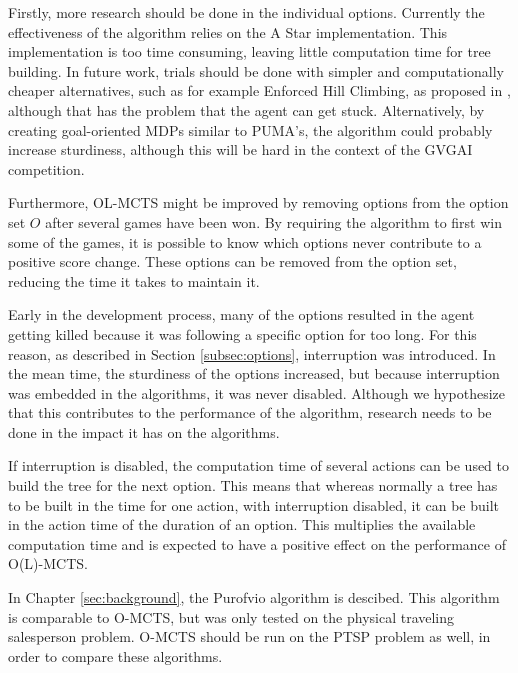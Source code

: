 Firstly, more research should be done in the individual options. Currently the
effectiveness of the algorithm relies on the A Star implementation.  This
implementation is too time consuming, leaving little computation time for tree
building. In future work, trials should be done with simpler and computationally
cheaper alternatives, such as for example Enforced Hill Climbing, as proposed in
\cite{ross2014general}, although that has the problem that the agent can get
stuck. Alternatively, by creating goal-oriented MDPs similar to PUMA's, the
algorithm could probably increase sturdiness, although this will be hard in the
context of the GVGAI competition.

Furthermore, OL-MCTS might be improved by removing options from the option set
$O$ after several games have been won. By requiring the algorithm to first win
some of the games, it is possible to know which options never contribute to a
positive score change. These options can be removed from the option set,
reducing the time it takes to maintain it.

Early in the development process, many of the options resulted in the agent
getting killed because it was following a specific option for too long. For this
reason, as described in Section \ref{subsec:options}, interruption was
introduced. In the mean time, the sturdiness of the options increased, but
because interruption was embedded in the algorithms, it was never disabled.
Although we hypothesize that this contributes to the performance of the
algorithm, research needs to be done in the impact it has on the algorithms.

If interruption is disabled, the computation time of several actions can be
used to build the tree for the next option. This means that whereas normally a
tree has to be built in the time for one action, with interruption disabled, it
can be built in the action time of the duration of an option. This multiplies
the available computation time and is expected to have a positive effect on the
performance of O(L)-MCTS.

In Chapter \ref{sec:background}, the Purofvio algorithm is descibed. This
algorithm is comparable to O-MCTS, but was only tested on the physical traveling
salesperson problem. O-MCTS should be run on the PTSP problem as well, in order
to compare these algorithms.

